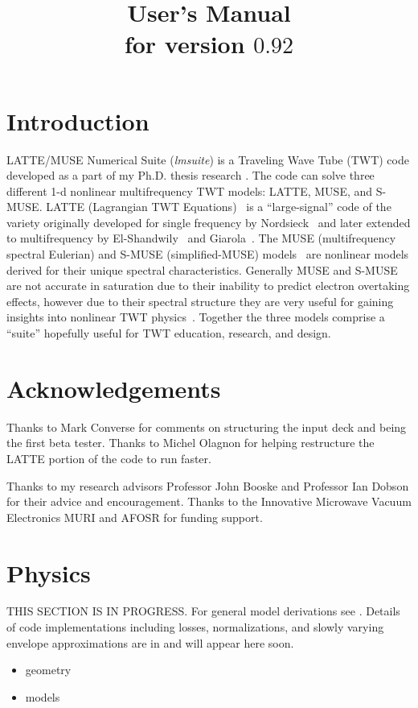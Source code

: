 \documentclass{article}
\title{\lmsuite User's Manual\\
  for version $0.92$}
\author{}
\begin{document}
\maketitle
\tableofcontents
\section{Introduction}
LATTE/MUSE Numerical Suite ({\em lmsuite}) is a Traveling Wave Tube (TWT)
code developed as a part of my Ph.D. thesis research
\cite{wohlbier:phdthesis}. The code can solve three different
1-d nonlinear multifrequency TWT models: LATTE, MUSE, and S-MUSE.
LATTE (Lagrangian TWT Equations)~\cite{wohlbier:muse02}
is a ``large-signal'' code of the
variety originally developed for single frequency
by Nordsieck~\cite{nordsieck:lsbtwa53} and later extended
to multifrequency by El-Shandwily~\cite{el-shandwily:amstwa65}
and Giarola~\cite{giarola:msotwt68}. The MUSE (multifrequency
spectral Eulerian) and S-MUSE (simplified-MUSE) models~\cite{wohlbier:muse02}
are nonlinear models derived for their unique spectral characteristics.
Generally MUSE and S-MUSE are not accurate in saturation due to their
inability to predict electron overtaking effects, however due to their
spectral structure they are very useful for gaining insights into nonlinear
TWT physics~\cite{wohlbier:muse02, wohlbier:growth02, wohlbier:ampm03, wohlbier:hi03, wohlbier:phdthesis}.
Together the three models comprise a ``suite'' hopefully useful for
TWT education, research, and design.

\section{Acknowledgements}
Thanks to Mark Converse for comments on structuring the input deck
and being the first beta tester. Thanks to
Michel Olagnon for helping restructure the LATTE portion of the
code to run faster.

Thanks to my research advisors Professor John Booske
and Professor Ian Dobson for their advice and encouragement. Thanks to
the Innovative Microwave Vacuum Electronics MURI and AFOSR for funding
support.

\section{Physics}
THIS SECTION IS IN PROGRESS. For general model derivations see
\cite{wohlbier:muse02}. Details of code implementations including losses,
normalizations, and slowly varying envelope approximations are in
\cite{wohlbier:phdthesis} and will appear here soon.
\begin{itemize}
\item geometry
\item models
\end{itemize}
\end{document}
